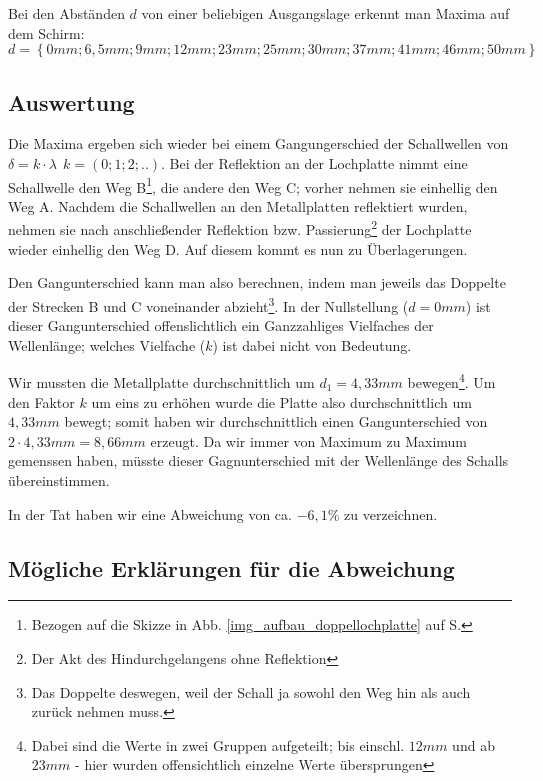 Bei den Abständen \(d\) von einer beliebigen Ausgangslage erkennt man Maxima auf dem Schirm:
\[d = \left \{0mm; 6,5mm; 9mm; 12mm; 23mm; 25mm; 30mm; 37mm; 41mm; 46mm; 50mm \right \} \]





\subsection{Auswertung}


Die Maxima ergeben sich wieder bei einem Gangungerschied der Schallwellen von \(\delta = k \cdot \lambda ~~ k = (0; 1; 2; ..)\). Bei der Reflektion an der Lochplatte nimmt eine Schallwelle den Weg B\footnote{Bezogen auf die Skizze in Abb. \ref{img_aufbau_doppellochplatte} auf S. \pageref{img_aufbau_doppellochplatte}}, die andere den Weg C; vorher nehmen sie einhellig den Weg A. Nachdem die Schallwellen an den Metallplatten reflektiert wurden, nehmen sie nach anschließender Reflektion bzw. Passierung\footnote{Der Akt des Hindurchgelangens ohne Reflektion} der Lochplatte wieder einhellig den Weg D. Auf diesem kommt es nun zu Überlagerungen.

Den Gangunterschied kann man also berechnen, indem man jeweils das Doppelte der Strecken B und C voneinander abzieht\footnote{Das Doppelte deswegen, weil der Schall ja sowohl den Weg hin als auch zurück nehmen muss.}. In der Nullstellung (\(d = 0mm\)) ist dieser Gangunterschied offenslichtlich ein Ganzzahliges Vielfaches der Wellenlänge; welches Vielfache (\(k\)) ist dabei nicht von Bedeutung.

Wir mussten die Metallplatte durchschnittlich um \(d_1 = 4,33mm\) bewegen\footnote{Dabei sind die Werte in zwei Gruppen aufgeteilt; bis einschl. \(12mm\) und ab \(23mm\) - hier wurden offensichtlich einzelne Werte übersprungen}. Um den Faktor \(k\) um eins zu erhöhen wurde die Platte also durchschnittlich um \(4,33mm\) bewegt; somit haben wir durchschnittlich einen Gangunterschied von \(2 \cdot 4,33mm = 8,66mm\) erzeugt. Da wir immer von Maximum zu Maximum gemenssen haben, müsste dieser Gagnunterschied mit der Wellenlänge des Schalls übereinstimmen. 

In der Tat haben wir eine Abweichung von ca. \(-6,1\%\) zu verzeichnen.





\subsection{Mögliche Erklärungen für die Abweichung}

